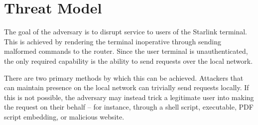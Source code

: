 \section{Threat Model}\label{sec:threat-model}

The goal of the adversary is to disrupt service to users of the Starlink terminal.
This is achieved by rendering the terminal inoperative through sending malformed commands to the router.
Since the user terminal is unauthenticated, the only required capability is the ability to send requests over the local network.

There are two primary methods by which this can be achieved.
Attackers that can maintain presence on the local network can trivially send requests locally.
If this is not possible, the adversary may instead trick a legitimate user into making the request on their behalf -- for instance, through a shell script, executable, PDF script embedding, or malicious website.